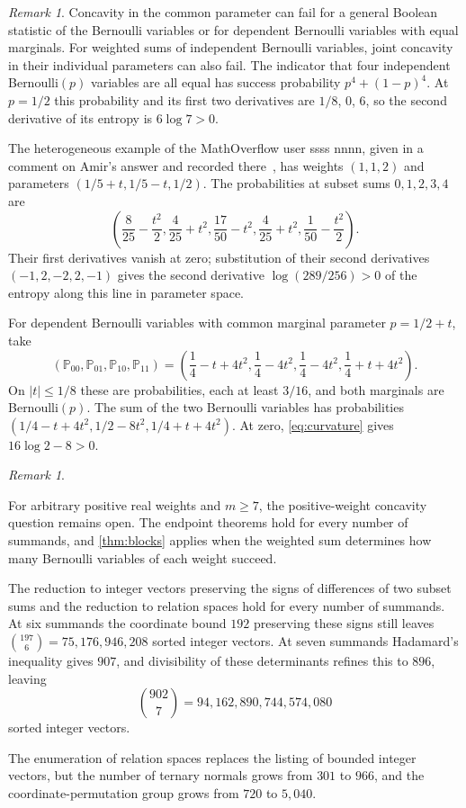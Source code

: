 \documentclass[11pt,a4paper]{article}
\numberwithin{equation}{section}
\theoremstyle{remark}
\newtheorem{remark}[theorem]{Remark}
\newcommand{\Pp}{\mathbb P}
\begin{document}
\begin{remark}\label{rem:hypotheses}
Concavity in the common parameter can fail for a general Boolean statistic of the Bernoulli variables or for dependent Bernoulli variables with equal marginals. For weighted sums of independent Bernoulli variables, joint concavity in their individual parameters can also fail. The indicator that four independent Bernoulli$(p)$ variables are all equal has success probability $p^4+(1-p)^4$. At $p=1/2$ this probability and its first two derivatives are $1/8$, $0$, $6$, so the second derivative of its entropy is $6\log7>0$.

The heterogeneous example of the MathOverflow user ssss nnnn, given in a comment on Amir's answer and recorded there~\cite{Amir}, has weights $(1,1,2)$ and parameters $(1/5+t,1/5-t,1/2)$. The probabilities at subset sums $0,1,2,3,4$ are
\[
 \left(\frac8{25}-\frac{t^2}2,\frac4{25}+t^2,
 \frac{17}{50}-t^2,\frac4{25}+t^2,\frac1{50}-\frac{t^2}2\right).
\]
Their first derivatives vanish at zero; substitution of their second derivatives $(-1,2,-2,2,-1)$ gives the second derivative $\log(289/256)>0$ of the entropy along this line in parameter space.

For dependent Bernoulli variables with common marginal parameter $p=1/2+t$, take
\[
 (\Pp_{00},\Pp_{01},\Pp_{10},\Pp_{11})
 =\left(\frac14-t+4t^2,\frac14-4t^2,
 \frac14-4t^2,\frac14+t+4t^2\right).
\]
On $|t|\le1/8$ these are probabilities, each at least $3/16$, and both marginals are Bernoulli$(p)$. The sum of the two Bernoulli variables has probabilities $(1/4-t+4t^2,1/2-8t^2,1/4+t+4t^2)$. At zero, \eqref{eq:curvature} gives $16\log2-8>0$.
\end{remark}

\begin{remark}\label{sec:open}

For arbitrary positive real weights and $m\ge7$, the positive-weight concavity question remains open. The endpoint theorems hold for every number of summands, and \cref{thm:blocks} applies when the weighted sum determines how many Bernoulli variables of each weight succeed.

The reduction to integer vectors preserving the signs of differences of two subset sums and the reduction to relation spaces hold for every number of summands. At six summands the coordinate bound $192$ preserving these signs still leaves
$\binom{197}{6}=75{,}176{,}946{,}208$ sorted integer vectors. At seven summands Hadamard's inequality gives $907$, and divisibility of these determinants refines this to $896$, leaving
\[
 \binom{902}{7}=94{,}162{,}890{,}744{,}574{,}080
\]
sorted integer vectors.

The enumeration of relation spaces replaces the listing of bounded integer vectors, but the number of ternary normals grows from $301$ to $966$, and the coordinate-permutation group grows from $720$ to $5{,}040$.

\end{remark}
\end{document}
